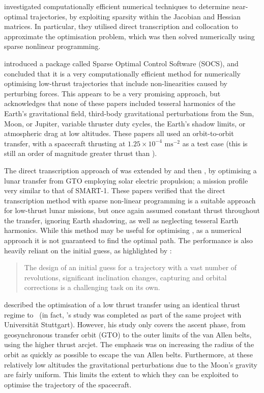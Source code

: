 \textcite{Betts1993} investigated computationally efficient numerical techniques to determine near-optimal trajectories, by exploiting sparsity within the Jacobian and Hessian matrices. In particular, they utilised direct transcription and collocation to approximate the optimisation problem, which was then solved numerically using sparse nonlinear programming.
 
\textcite{Betts1994} introduced a package called Sparse Optimal Control Software (SOCS), and concluded that it is a very computationally efficient method for numerically optimising low-thrust trajectories that include non-linearities caused by perturbing forces. This appears to be a very promising approach, but \textcite{Betts2000} acknowledges that none of these papers included tesseral harmonics of the Earth's gravitational field, third-body gravitational perturbations from the Sun, Moon, or Jupiter, variable thruster duty cycles, the Earth's shadow limits, or atmospheric drag at low altitudes. These papers all used an orbit-to-orbit transfer, with a spacecraft thrusting
 at $1.25\times10^{-4}\text{ ms}^{-2}$ as a test case (this is still an order of magnitude greater thrust than \BW).

The direct transcription approach of \textcite{Betts1993} was extended by \textcite{Erb_thesis} and then \textcite{Betts2003}, by optimising a lunar transfer from GTO employing solar electric propulsion; a mission profile very similar to that of SMART-1. These papers verified that the direct transcription method with sparse non-linear programming is a suitable approach for low-thrust lunar missions, but once again assumed constant thrust throughout the transfer, ignoring Earth shadowing, as well as neglecting tesseral Earth harmonics. While this method may be useful for optimising \BW, as a numerical approach it is not guaranteed to find the optimal path. The performance is also heavily reliant on the initial guess, as highlighted by \textcite{Betts2003}: 

\begin{quotation}The design of an initial guess for a trajectory with a vast number of revolutions, significant inclination changes, capturing and orbital corrections is a challenging task on its own.\end{quotation}

\textcite{Letterio_thesis} described the optimisation of a low thrust transfer using an identical thrust regime to \BW\ (in fact, \citeauthor{Letterio_thesis}'s study was completed as part of the same project with Universit\"{a}t Stuttgart). However, his study only covers the ascent phase, from geosynchronous transfer orbit (GTO) to the outer limits of the van Allen belts, using the higher thrust arcjet. The emphasis was on increasing the radius of the orbit as quickly as possible to escape the van Allen belts. Furthermore, at these relatively low altitudes the gravitational perturbations due to the Moon's gravity are fairly uniform. This limits the extent to which they can be exploited to optimise the trajectory of the spacecraft.

